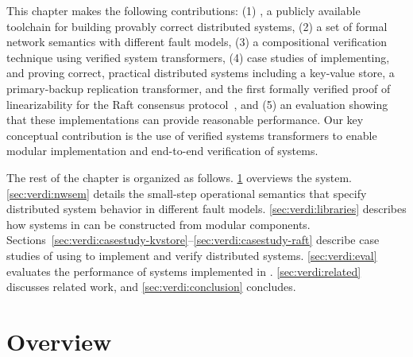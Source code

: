 %
%
%


This chapter makes the following contributions:
%
(1) \Verdi, a publicly available~\cite{verdi-repo} toolchain for
building provably correct distributed systems,
%
(2) a set of formal network semantics with different fault models,
%
(3) a compositional verification technique using verified system
transformers,
%
(4) case studies of implementing, and proving correct, practical
distributed systems including a key-value store, a primary-backup
replication transformer, and the first formally verified proof of
linearizability for the Raft consensus protocol~\cite{ongaro:raft},
%
and (5) an evaluation showing that these implementations
can provide reasonable performance.
%
Our key conceptual contribution is the use of verified
systems transformers to enable modular implementation and end-to-end
verification of systems.

The rest of the chapter is organized as follows.
%
\cref{sec:verdi:overview} overviews the \Verdi system.
%
\cref{sec:verdi:nwsem} details the small-step operational semantics that
specify distributed system behavior in different fault models.
%
\cref{sec:verdi:libraries} describes how systems in \Verdi can
be constructed from modular components.
%
Sections~\ref{sec:verdi:casestudy-kvstore}--\ref{sec:verdi:casestudy-raft} describe
case studies of using \Verdi to implement and verify distributed systems.
%
\cref{sec:verdi:eval} evaluates the performance of systems implemented in
\Verdi.
%
\cref{sec:verdi:related} discusses related work, and \cref{sec:verdi:conclusion}
concludes.


\section{Overview}
\label{sec:verdi:overview}

